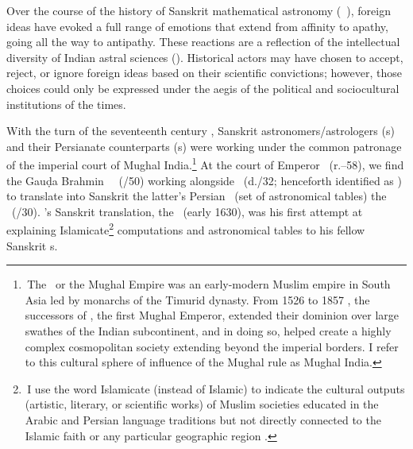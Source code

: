 \renewcommand{\thefootnote}{\arabic{footnote}} %

Over the course of the history of Sanskrit mathematical astronomy (\ganita\ \jyotisa), foreign ideas have evoked a full range of emotions that extend from affinity to apathy, going all the way to antipathy. These reactions are a reflection of the intellectual diversity of Indian astral sciences (\jyotihsastra). Historical actors may have chosen to accept, reject, or ignore foreign ideas based on their scientific convictions; however, those choices could only be expressed under the aegis of the political and sociocultural institutions of the times. 

With the turn of the seventeenth century \ce, Sanskrit astronomers/astrologers (\jyotisa s) and their Persianate counterparts (\munajjim s) were working under the common patronage of the imperial court of Mughal India.\footnote{\,The \GurkaniAlam\ or the Mughal Empire was an early-modern Muslim empire in South Asia led by monarchs of the Timurid dynasty. From 1526 to 1857 \ce, the successors of \Baburfull, the first Mughal Emperor, extended their dominion over large swathes of the Indian subcontinent, and in doing so, helped create a highly complex cosmopolitan society extending beyond the imperial borders. I refer to this cultural sphere of influence of the Mughal rule as Mughal India.} At the court of Emperor \Shahjahan\ (r.--58), we find the Gauḍa Brahmin \Pandita\ \Nityanandafull\ (/50) working alongside \MullaFaridfull\ (d.\thinspace {}/32; henceforth identified as \MullaFarid) to translate into Sanskrit the latter's Persian \zij\ (set of astronomical tables) the  \ZijiShahJahani\ (/30). \Nityananda's Sanskrit translation, the \Siddhantasindhu\ (\circa early 1630), was his first attempt at explaining Islamicate\footnote{\,I use the word Islamicate (instead of Islamic) to indicate the cultural outputs (\eg artistic, literary, or scientific works) of Muslim societies educated in the Arabic and Persian language traditions but not directly connected to the Islamic faith or any particular geographic region \parencite[\vid\ recent discussions on Islamicate Secularities in][]{Dressleretal}.\label{islamicate_defintion}} computations and astronomical tables to his fellow Sanskrit \jyotisa s. 

